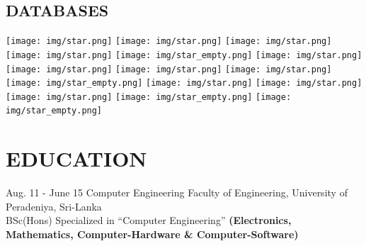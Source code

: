 \documentclass[]{cv-class}
\begin{document}
\begin{aside}
  \section{DATABASES}
    {\texttt{[image: img/star.png]}
    \texttt{[image: img/star.png]}
    \texttt{[image: img/star.png]}
    \texttt{[image: img/star.png]}
    \texttt{[image: img/star\_empty.png]}}
    {\texttt{[image: img/star.png]}
    \texttt{[image: img/star.png]}
    \texttt{[image: img/star.png]}
    \texttt{[image: img/star.png]}
    \texttt{[image: img/star\_empty.png]}}
    {\texttt{[image: img/star.png]}
    \texttt{[image: img/star.png]}
    \texttt{[image: img/star.png]}
    \texttt{[image: img/star\_empty.png]}
    \texttt{[image: img/star\_empty.png]}}    
    ~
\end{aside}

\section{EDUCATION}
\begin{entrylist}
  \entry
    {Aug. 11 - June 15}
    {Computer Engineering}
    {Faculty of Engineering, University of Peradeniya, Sri-Lanka}
    {   \\
        BSc(Hons) Specialized in “Computer Engineering” 
        \textbf{ (Electronics, Mathematics, Computer-Hardware \& Computer-Software) }
    }
\end{entrylist}
\end{document}
